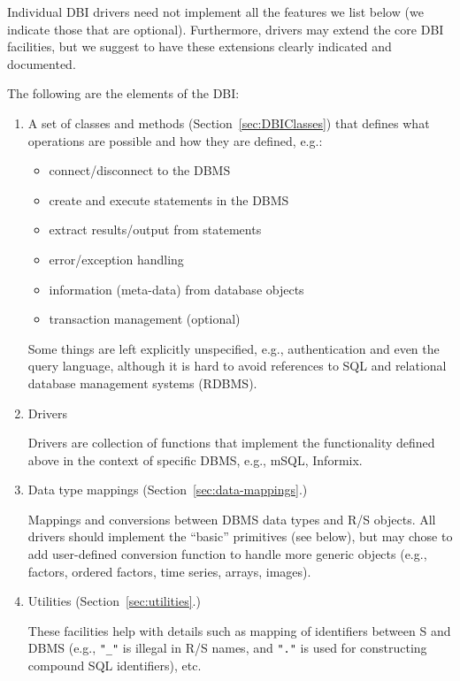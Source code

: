 \documentclass[graphics,times,psfig,dvips,hyper]{article}
\begin{document}
Individual DBI drivers need not implement all the features we
list below (we indicate those that are optional).  Furthermore,
drivers may extend the core DBI facilities, but we suggest to have
these extensions clearly indicated and documented.

The following are the elements of the DBI:
\begin{enumerate}
\item A set of classes and methods (Section~\ref{sec:DBIClasses})
  that defines what operations are possible and how they are defined, 
  e.g.:
  \begin{itemize}
  \item connect/disconnect to the DBMS
  \item create and execute statements in the DBMS
  \item extract results/output from statements
  \item error/exception handling
  \item information (meta-data) from database objects
  \item transaction management (optional)
  \end{itemize}

  Some things are left explicitly unspecified, e.g., authentication
  and even the query language, although it is hard to avoid references 
  to SQL and relational database management systems (RDBMS).

\item Drivers
  
  Drivers are collection of functions that implement the functionality
  defined above in the context of specific DBMS, e.g., mSQL, Informix.

\item Data type mappings (Section~\ref{sec:data-mappings}.)
  
  Mappings and conversions between DBMS data types and R/S objects.
  All drivers should implement the ``basic'' primitives (see below), 
  but may chose to add user-defined conversion function to handle
  more generic objects (e.g., factors, ordered factors, time series,
  arrays, images).

\item Utilities (Section~\ref{sec:utilities}.)
  
  These facilities help with details such as mapping of identifiers
  between S and DBMS (e.g., \texttt{"\_"} is illegal in R/S
  names, and \texttt{"."} is used for constructing compound SQL
  identifiers), etc.

\end{enumerate}
\end{document}
